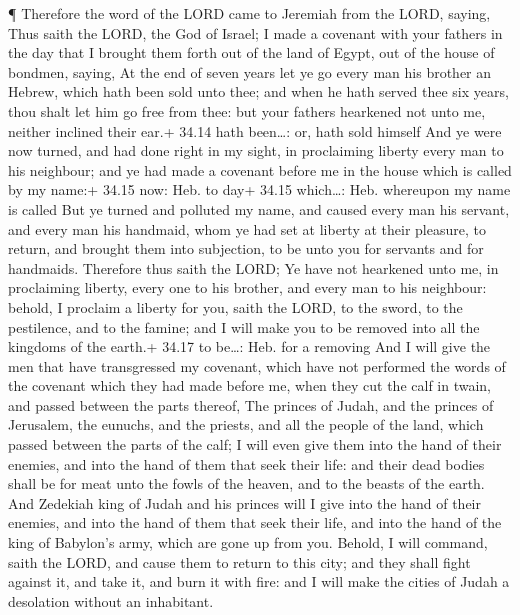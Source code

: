  ¶ Therefore the word of the LORD came to Jeremiah from the
LORD, saying,  Thus saith the LORD, the God of Israel; I
made a covenant with your fathers in the day that I brought them forth
out of the land of Egypt, out of the house of bondmen, saying,
 At the end of seven years let ye go every man his brother
an Hebrew, which hath been sold unto thee; and when he hath served thee
six years, thou shalt let him go free from thee: but your fathers
hearkened not unto me, neither inclined their ear.+ 34.14 hath
been\ldots: or, hath sold himself  And ye were now turned,
and had done right in my sight, in proclaiming liberty every man to his
neighbour; and ye had made a covenant before me in the house which is
called by my name:+ 34.15 now: Heb. to day+ 34.15 which\ldots: Heb.
whereupon my name is called  But ye turned and polluted my
name, and caused every man his servant, and every man his handmaid, whom
ye had set at liberty at their pleasure, to return, and brought them
into subjection, to be unto you for servants and for handmaids.
 Therefore thus saith the LORD; Ye have not hearkened unto
me, in proclaiming liberty, every one to his brother, and every man to
his neighbour: behold, I proclaim a liberty for you, saith the LORD, to
the sword, to the pestilence, and to the famine; and I will make you to
be removed into all the kingdoms of the earth.+ 34.17 to be\ldots: Heb.
for a removing  And I will give the men that have
transgressed my covenant, which have not performed the words of the
covenant which they had made before me, when they cut the calf in twain,
and passed between the parts thereof,  The princes of
Judah, and the princes of Jerusalem, the eunuchs, and the priests, and
all the people of the land, which passed between the parts of the calf;
 I will even give them into the hand of their enemies, and
into the hand of them that seek their life: and their dead bodies shall
be for meat unto the fowls of the heaven, and to the beasts of the
earth.  And Zedekiah king of Judah and his princes will I
give into the hand of their enemies, and into the hand of them that seek
their life, and into the hand of the king of Babylon's army, which are
gone up from you.  Behold, I will command, saith the LORD,
and cause them to return to this city; and they shall fight against it,
and take it, and burn it with fire: and I will make the cities of Judah
a desolation without an inhabitant.

